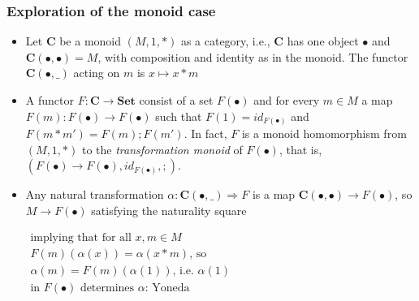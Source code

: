 \documentclass[handout]{beamer}
\newcommand{\To}{\Rightarrow}
\newcommand{\bfsf}[1]{{\boldsymbol{#1}}}
\newcommand{\Set}{\bfsf{Set}}
\newcommand{\CC}{\bfsf{C}}
\begin{document}
\frame
  {   
    \frametitle{Exploration of the monoid case}\label{Yon:Mon}

 \begin{itemize}[<+->]
\item Let $\CC$ be a monoid $(M,1,*)$ as a category, i.e., $\CC$ has one object
$\bullet$ and $\CC(\bullet,\bullet)=M$, with composition and identity as in the monoid.
The functor $\CC(\bullet,\_)$ acting on $m$ is $x\mapsto x*m$ %
\item A functor $F:\CC\to\Set$ consist of a set $F(\bullet)$ and for every
$m\in M$ a map $F(m) : F(\bullet)\to F(\bullet)$ such that $F(1)= id_{F(\bullet)}$
and $F(m*m')=F(m);F(m')$. In fact, $F$ is a monoid homomorphism from
$(M,1,*)$ to the \emph{transformation monoid} of $F(\bullet)$, that is,
$(F(\bullet)\to F(\bullet), id_{F(\bullet)}, ;)$.
\item Any natural transformation $\alpha: \CC(\bullet,\_)\To F$ is
a map $\CC(\bullet,\bullet)\to F(\bullet)$, so $M\to F(\bullet)$ satisfying the naturality square
$\begin{array}{l}%
\text{implying that for all $x,m\in M$}\\
\text{$F(m)(\alpha(x)) = \alpha(x*m)$, so}\\
\text{$\alpha(m) = F(m)(\alpha(1))$, i.e.\ $\alpha(1)$}\\
\text{in $F(\bullet)$ determines $\alpha$: Yoneda}
\end{array}$

 \end{itemize}

 }
\end{document}
